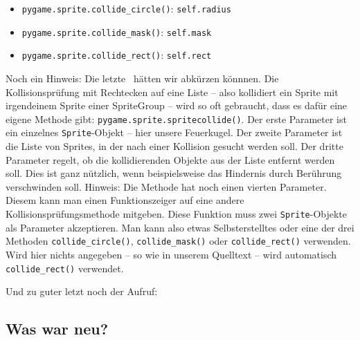 \begin{itemize}
    \item \texttt{pygame.sprite.collide\_circle()}: \texttt{self.radius}
    \item \texttt{pygame.sprite.collide\_mask()}: \texttt{self.mask}
    \item \texttt{pygame.sprite.collide\_rect()}: \texttt{self.rect}
\end{itemize}


Noch ein Hinweis: Die letzte \forSchleife\ hätten wir abkürzen könnnen. Die Kollisionsprüfung mit Rechtecken auf eine Liste -- also kollidiert ein Sprite mit irgendeinem Sprite einer SpriteGroup -- wird so oft gebraucht, dass es dafür eine eigene Methode gibt: \texttt{pygame.sprite.spritecollide()}. Der erste Parameter ist ein einzelnes \texttt{Sprite}-Objekt -- hier unsere Feuerkugel. Der zweite Parameter ist die Liste von Sprites, in der nach einer Kollision gesucht werden soll. Der dritte Parameter regelt, ob die kollidierenden Objekte aus der Liste entfernt werden soll. Dies ist ganz nützlich, wenn beispielsweise das Hindernis durch Berührung verschwinden soll. Hinweis: Die Methode hat noch einen vierten Parameter. Diesem kann man einen Funktionszeiger auf eine andere Kollisionsprüfungsmethode mitgeben. Diese Funktion muss zwei \texttt{Sprite}-Objekte als Parameter akzeptieren. Man kann also etwas Selbsterstelltes oder eine der drei Methoden \texttt{collide\_circle()}, \texttt{collide\_mask()} oder \texttt{collide\_rect()} verwenden. Wird hier nichts angegeben -- so wie in unserem Quelltext -- wird automatisch \texttt{collide\_rect()} verwendet.


Und zu guter letzt noch der Aufruf:



\subsection*{Was war neu?}

